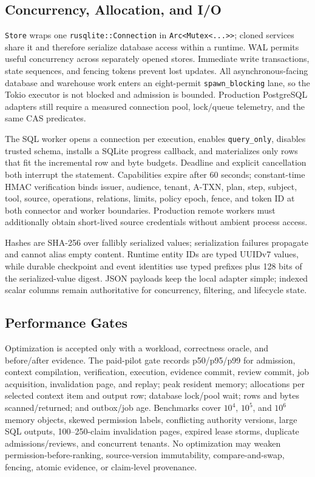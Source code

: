 \documentclass[10pt]{article}
\newcommand{\code}[1]{\texttt{#1}}
\newcommand{\atxn}{\textsc{A-TXN}\xspace}
\begin{document}
\subsection{Concurrency, Allocation, and I/O}

\code{Store} wraps one \code{rusqlite::Connection} in \code{Arc<Mutex<...>>}; cloned services share it and therefore serialize database access within a runtime. WAL permits useful concurrency across separately opened stores. Immediate write transactions, state sequences, and fencing tokens prevent lost updates. All asynchronous-facing database and warehouse work enters an eight-permit \code{spawn\_blocking} lane, so the Tokio executor is not blocked and admission is bounded. Production PostgreSQL adapters still require a measured connection pool, lock/queue telemetry, and the same CAS predicates.

The SQL worker opens a connection per execution, enables \code{query\_only}, disables trusted schema, installs a SQLite progress callback, and materializes only rows that fit the incremental row and byte budgets. Deadline and explicit cancellation both interrupt the statement. Capabilities expire after 60 seconds; constant-time HMAC verification binds issuer, audience, tenant, \atxn, plan, step, subject, tool, source, operations, relations, limits, policy epoch, fence, and token ID at both connector and worker boundaries. Production remote workers must additionally obtain short-lived source credentials without ambient process access.

Hashes are SHA-256 over fallibly serialized values; serialization failures propagate and cannot alias empty content. Runtime entity IDs are typed UUIDv7 values, while durable checkpoint and event identities use typed prefixes plus 128 bits of the serialized-value digest. JSON payloads keep the local adapter simple; indexed scalar columns remain authoritative for concurrency, filtering, and lifecycle state.

\subsection{Performance Gates}

Optimization is accepted only with a workload, correctness oracle, and before/after evidence. The paid-pilot gate records p50/p95/p99 for admission, context compilation, verification, execution, evidence commit, review commit, job acquisition, invalidation page, and replay; peak resident memory; allocations per selected context item and output row; database lock/pool wait; rows and bytes scanned/returned; and outbox/job age. Benchmarks cover $10^4$, $10^5$, and $10^6$ memory objects, skewed permission labels, conflicting authority versions, large SQL outputs, 100--250-claim invalidation pages, expired lease storms, duplicate admissions/reviews, and concurrent tenants. No optimization may weaken permission-before-ranking, source-version immutability, compare-and-swap, fencing, atomic evidence, or claim-level provenance.
\end{document}
